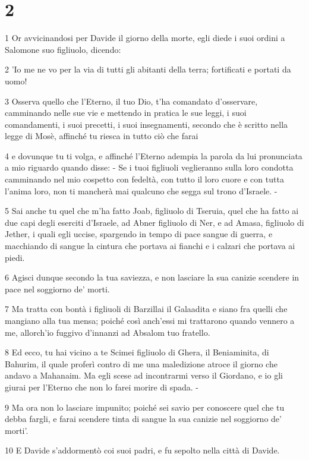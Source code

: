 \chapter{2}

\par 1 Or avvicinandosi per Davide il giorno della morte, egli diede i suoi ordini a Salomone suo figliuolo, dicendo:
\par 2 'Io me ne vo per la via di tutti gli abitanti della terra; fortificati e portati da uomo!
\par 3 Osserva quello che l'Eterno, il tuo Dio, t'ha comandato d'osservare, camminando nelle sue vie e mettendo in pratica le sue leggi, i suoi comandamenti, i suoi precetti, i suoi insegnamenti, secondo che è scritto nella legge di Mosè, affinché tu riesca in tutto ciò che farai
\par 4 e dovunque tu ti volga, e affinché l'Eterno adempia la parola da lui pronunciata a mio riguardo quando disse: - Se i tuoi figliuoli veglieranno sulla loro condotta camminando nel mio cospetto con fedeltà, con tutto il loro cuore e con tutta l'anima loro, non ti mancherà mai qualcuno che segga sul trono d'Israele. -
\par 5 Sai anche tu quel che m'ha fatto Joab, figliuolo di Tseruia, quel che ha fatto ai due capi degli eserciti d'Israele, ad Abner figliuolo di Ner, e ad Amasa, figliuolo di Jether, i quali egli uccise, spargendo in tempo di pace sangue di guerra, e macchiando di sangue la cintura che portava ai fianchi e i calzari che portava ai piedi.
\par 6 Agisci dunque secondo la tua saviezza, e non lasciare la sua canizie scendere in pace nel soggiorno de' morti.
\par 7 Ma tratta con bontà i figliuoli di Barzillai il Galaadita e siano fra quelli che mangiano alla tua mensa; poiché così anch'essi mi trattarono quando vennero a me, allorch'io fuggivo d'innanzi ad Absalom tuo fratello.
\par 8 Ed ecco, tu hai vicino a te Scimei figliuolo di Ghera, il Beniaminita, di Bahurim, il quale proferì contro di me una maledizione atroce il giorno che andavo a Mahanaim. Ma egli scese ad incontrarmi verso il Giordano, e io gli giurai per l'Eterno che non lo farei morire di spada. -
\par 9 Ma ora non lo lasciare impunito; poiché sei savio per conoscere quel che tu debba fargli, e farai scendere tinta di sangue la sua canizie nel soggiorno de' morti'.
\par 10 E Davide s'addormentò coi suoi padri, e fu sepolto nella città di Davide.
